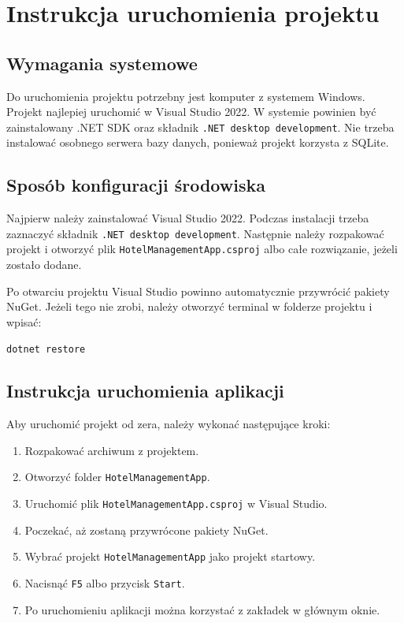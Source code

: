 \chapter{Instrukcja uruchomienia projektu}

\section{Wymagania systemowe}

Do uruchomienia projektu potrzebny jest komputer z systemem Windows. Projekt najlepiej uruchomić w Visual Studio 2022. W systemie powinien być zainstalowany .NET SDK oraz składnik \texttt{.NET desktop development}. Nie trzeba instalować osobnego serwera bazy danych, ponieważ projekt korzysta z SQLite.

\section{Sposób konfiguracji środowiska}

Najpierw należy zainstalować Visual Studio 2022. Podczas instalacji trzeba zaznaczyć składnik \texttt{.NET desktop development}. Następnie należy rozpakować projekt i otworzyć plik \texttt{HotelManagementApp.csproj} albo całe rozwiązanie, jeżeli zostało dodane.

Po otwarciu projektu Visual Studio powinno automatycznie przywrócić pakiety NuGet. Jeżeli tego nie zrobi, należy otworzyć terminal w folderze projektu i wpisać:

\begin{lstlisting}[style=textStyle,caption={Przywrócenie pakietów NuGet},label={lst:restore}]
dotnet restore
\end{lstlisting}

\section{Instrukcja uruchomienia aplikacji}

Aby uruchomić projekt od zera, należy wykonać następujące kroki:

\begin{enumerate}
  \item Rozpakować archiwum z projektem.
  \item Otworzyć folder \texttt{HotelManagementApp}.
  \item Uruchomić plik \texttt{HotelManagementApp.csproj} w Visual Studio.
  \item Poczekać, aż zostaną przywrócone pakiety NuGet.
  \item Wybrać projekt \texttt{HotelManagementApp} jako projekt startowy.
  \item Nacisnąć \texttt{F5} albo przycisk \texttt{Start}.
  \item Po uruchomieniu aplikacji można korzystać z zakładek w głównym oknie.
\end{enumerate}

